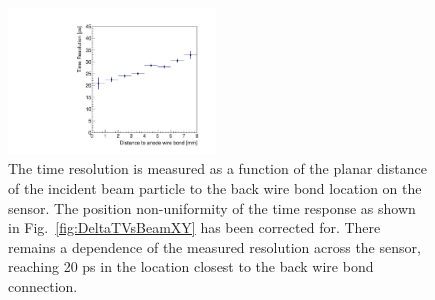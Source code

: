\begin{figure}[htbp]
\centering 
\includegraphics[width=0.49\textwidth]{figures/TimeResolutionVsR.pdf} 
\caption{ The time resolution is measured as a function of the planar distance of the 
incident beam particle to the back wire bond location on the sensor. The position non-uniformity
of the time response as shown in Fig.~\ref{fig:DeltaTVsBeamXY} has been corrected for. There 
remains a dependence of the measured resolution across the sensor, reaching 20 ps in the location
closest to the back wire bond connection.}
\label{fig:TimeResolutionVsR}
\end{figure}




